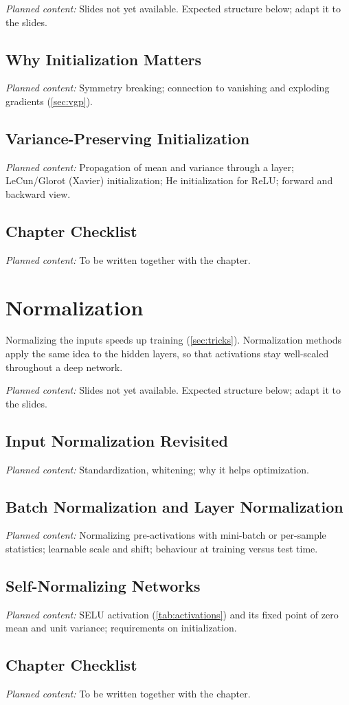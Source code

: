 \documentclass[11pt, oneside]{book}
\newcommand{\planned}[1]{%
  \par{\small\color{gray!70!black}\textit{Planned content:} #1}\par}
\let\originalsection\section
\renewcommand{\section}{\Needspace{7\baselineskip}\originalsection}
\begin{document}
\planned{Slides not yet available. Expected structure below; adapt it to the
slides.}

\section{Why Initialization Matters}
\planned{Symmetry breaking; connection to vanishing and exploding gradients
(\cref{sec:vgp}).}

\section{Variance-Preserving Initialization}
\planned{Propagation of mean and variance through a layer; LeCun/Glorot
(Xavier) initialization; He initialization for ReLU; forward and backward
view.}

\section{Chapter Checklist}
\planned{To be written together with the chapter.}


\chapter{Normalization}
\label{ch:normalization}

Normalizing the inputs speeds up training (\cref{sec:tricks}). Normalization
methods apply the same idea to the hidden layers, so that activations stay
well-scaled throughout a deep network.

\planned{Slides not yet available. Expected structure below; adapt it to the
slides.}

\section{Input Normalization Revisited}
\planned{Standardization, whitening; why it helps optimization.}

\section{Batch Normalization and Layer Normalization}
\planned{Normalizing pre-activations with mini-batch or per-sample
statistics; learnable scale and shift; behaviour at training versus test
time.}

\section{Self-Normalizing Networks}
\planned{SELU activation (\cref{tab:activations}) and its fixed point of
zero mean and unit variance; requirements on initialization.}

\section{Chapter Checklist}
\planned{To be written together with the chapter.}
\end{document}
